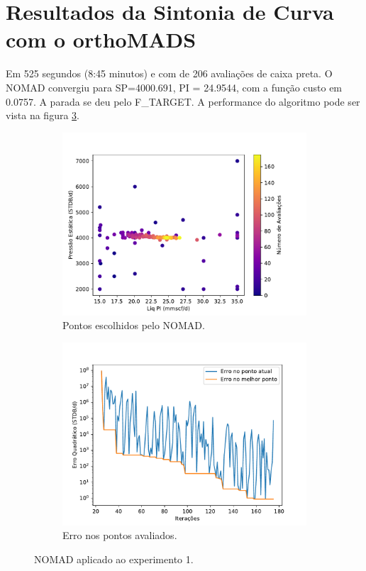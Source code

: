 \section{Resultados da Sintonia de Curva com o orthoMADS}

Em 525 segundos (8:45 minutos) e com de 206 avaliações de caixa preta. O NOMAD convergiu para SP=4000.691, PI = 24.9544, com a função custo em 0.0757. A parada se deu pelo F\_TARGET. A performance do algoritmo pode ser vista na figura \ref{fig:setup1_2}.


\begin{figure}
\centering
\begin{subfigure}{0.5\textwidth}
  \centering
  \includegraphics[width=1\linewidth]{figs/setup1_eval_points.pdf}
  \caption{Pontos escolhidos pelo NOMAD.}
  \label{fig:setup1_points}
\end{subfigure}%
\begin{subfigure}{0.5\textwidth}
  \centering
  \includegraphics[width=1\linewidth]{figs/setup1_errors.pdf}
  \caption{Erro nos pontos avaliados.}
  \label{fig:setup1_error}
\end{subfigure}
\caption{NOMAD aplicado ao experimento 1.}
\label{fig:setup1_2}
\end{figure}

